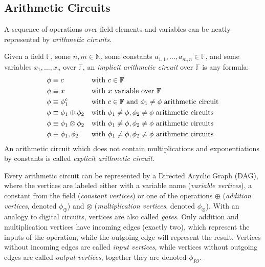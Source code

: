 
\subsection{Arithmetic Circuits}
A sequence of operations over field elements and variables can be neatly represented by
\emph{arithmetic circuits}.
\begin{definition}
	Given a field \(\mathbb{F}\), some \(n, m \in \mathbb{N}\), some constants
	\(a_{1, 1}, \dots, a_{m, n} \in \mathbb{F}\), and some variables \(x_1, \dots, x_n \) over
	\(\mathbb{F}\), an \emph{implicit arithmetic circuit} over \(\mathbb{F}\) is any formula:
	\begin{align*}
		 & \phi \equiv c                     &  & \textnormal{with \(c \in \mathbb{F}\)}
		\\
		 & \phi \equiv x                     &  & \textnormal{with \(x\) variable over
			\(\mathbb{F}\)}
		\\
		 & \phi \equiv \phi_1^c              &  & \textnormal{with \(c \in \mathbb{F}\) and
			\(\phi_1 \neq \phi \) arithmetic circuit}
		\\
		 & \phi \equiv \phi_1 \oplus \phi_2  &  & \textnormal{with \(\phi_1 \neq \phi, \phi_2 \neq
			\phi \)
			arithmetic circuits}
		\\
		 & \phi \equiv \phi_1 \otimes \phi_2 &  & \textnormal{with \(\phi_1 \neq \phi, \phi_2 \neq
			\phi \)
			arithmetic circuits}
		\\
		 & \phi \equiv \phi_1, \phi_2        &  & \textnormal{with \(\phi_1 \neq \phi, \phi_2 \neq
			\phi \)
			arithmetic circuits}
	\end{align*}
	An arithmetic circuit which does not contain multiplications and exponentiations by constants
	is called \emph{explicit arithmetic circuit}.
\end{definition}

\noindent Every arithmetic circuit can be represented by a Directed Acyclic Graph (DAG),
where the vertices are labeled either with a variable name (\emph{variable vertices}), a constant
from the field (\emph{constant vertices}) or one of the operations \(\oplus \)
(\emph{addition vertices}, denoted \(\phi_\oplus \)) and \(\otimes \) 
(\emph{multiplication vertices}, denoted \(\phi_\otimes \)).
With an analogy to digital circuits, vertices are also called \emph{gates}.
Only addition and multiplication vertices have incoming edges (exactly two), which represent the
inputs of the operation, while the outgoing edge will represent the result.
Vertices without incoming edges are called \emph{input vertices}, while vertices without outgoing
edges are called \emph{output vertices}, together they are denoted \(\phi_{IO}\).

